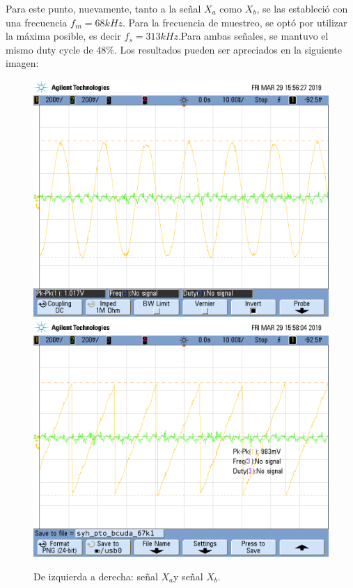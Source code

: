 \documentclass[../../ASSD_TP1_G7.tex]{subfiles}
\begin{document}
Para este punto, nuevamente, tanto a la señal $X_{a}$ como $X_{b}$,
se las estableció con una frecuencia $f_{in}=68kHz$. Para la frecuencia
de muestreo, se optó por utilizar la máxima posible, es decir $f_{s}=313kHz.$Para
ambas señales, se mantuvo el mismo duty cycle de 48\%. Los resultados
pueden ser apreciados en la siguiente imagen:

\begin{figure}[H]

\begin{centering}
\includegraphics[scale=0.25]{Imagenes/syh_pto_bsin_67k}\includegraphics[scale=0.25]{Imagenes/syh_pto_bcuda_67k1}\caption{De izquierda a derecha: señal $X_{a}$y señal $X_{b}$.}
\par\end{centering}
\end{figure}
\end{document}
